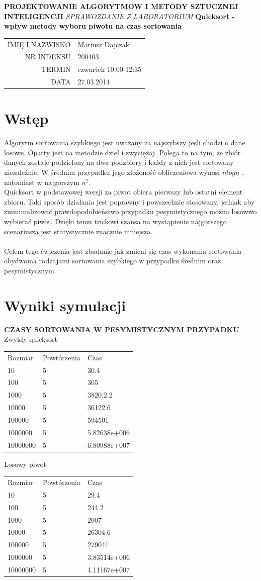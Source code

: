 \documentclass[10pt,oneside]{mwbk}
\renewcommand {\maketitle}{
\begin {titlepage}
\begin {center}
	\LARGE
	\textbf {PROJEKTOWANIE ALGORYTMOW I METODY SZTUCZNEJ INTELIGENCJI}
	\newline
	\newline
	\textit {SPRAWOZDANIE Z  LABORATORIUM}
	\textbf{ Quicksort - wpływ metody wyboru piwotu na czas sortowania}
	\newline
	\begin{table}
	\begin{center}
	\begin{tabular}{rl}
	IMIĘ I NAZWISKO & Mariusz Dajczak \\
	NR INDEKSU & 200403 \\	
	TERMIN & czwartek 10:00-12:35 \\
	DATA  & 27.03.2014 \\
	\end{tabular}

	\end{center}
	\end{table}
\end {center}
\end {titlepage}}
\begin{document}
\maketitle
\section{Wstęp}
	

	\indent Algorytm sortowania szybkiego jest uważany za najszybszy jesli chodzi o dane losowe. Oparty jest na metodzie dziel i zwyciężaj. Polega to na tym, że zbiór danych zostaje podzielony na dwa podzbiory i każdy z nich jest sortowany niezależnie.
	W średnim przypadku jego złożoność obliczeniowa wynosi $nlogn$ , natomiast w najgorszym $n^{2}$.\\
	
	\indent Quicksort w podstawowej wersji za piwot obiera pierwszy lub ostatni element zbioru. Taki sposób działania jest poprawny i powszechnie stosowany, jednak aby zminimalizować prawdopodobieństwo przypadku pesymistycznego można losowwo wybierać piwot. Dzięki temu trickowi szansa na wystąpienie najgorszego scenariusza jest statystycznie znacznie mniejsza.\\
	\\
	\indent Celem tego ćwiczenia jest zbadanie jak zmieni się czas wykonania sortowania obydwoma rodzajami sortowania szybkiego w przypadku średnim oraz pesymistycznym.
	
\section {Wyniki symulacji}
	\textbf{CZASY SORTOWANIA W PESYMISTYCZNYM PRZYPADKU}
	\\
	Zwykły quicksort
	\begin{table}[!h]
	\begin{tabular}{lll}
	Rozmiar & Powtórzenia & Czas         \\
	10&5&30.4\\
100&5&305\\
1000&5&3820.2.2\\
10000&5&36122.6\\
100000&5&594501\\
1000000&5&5.82638e+006\\
10000000&5&6.80988e+007\\
	\end{tabular}
	\end{table}
	
	Losowy piwot
		\begin{table}[!h]
	\begin{tabular}{lll}
		Rozmiar & Powtórzenia & Czas         \\
10&5&29.4\\
100&5&244.2\\
1000&5&2007\\
10000&5&26304.6\\
100000&5&279041\\
1000000&5&3.83514e+006\\
10000000&5&4.11167e+007\\
	\end{tabular}
	\end{table}
	
\end{document}
